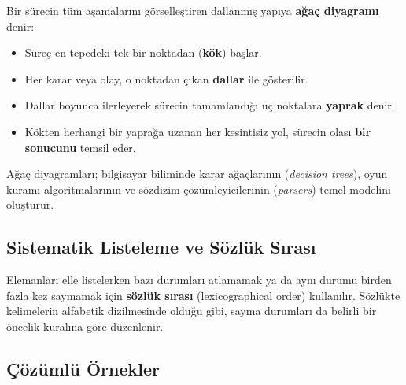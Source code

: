 \begin{definition}
Bir sürecin tüm aşamalarını görselleştiren dallanmış yapıya \textbf{ağaç diyagramı} denir:
\begin{itemize}
  \item Süreç en tepedeki tek bir noktadan (\textbf{kök}) başlar.
  \item Her karar veya olay, o noktadan çıkan \textbf{dallar} ile gösterilir.
  \item Dallar boyunca ilerleyerek sürecin tamamlandığı uç noktalara \textbf{yaprak} denir.
  \item Kökten herhangi bir yaprağa uzanan her kesintisiz yol, sürecin olası \textbf{bir sonucunu} temsil eder.
\end{itemize}
\end{definition}

Ağaç diyagramları; bilgisayar biliminde karar ağaçlarının (\textit{decision trees}), oyun kuramı algoritmalarının ve sözdizim çözümleyicilerinin (\textit{parsers}) temel modelini oluşturur.

\subsection{Sistematik Listeleme ve Sözlük Sırası}

Elemanları elle listelerken bazı durumları atlamamak ya da aynı durumu birden fazla kez saymamak için \textbf{sözlük sırası} (lexicographical order) kullanılır. Sözlükte kelimelerin alfabetik dizilmesinde olduğu gibi, sayma durumları da belirli bir öncelik kuralına göre düzenlenir.

\subsection{Çözümlü Örnekler}

